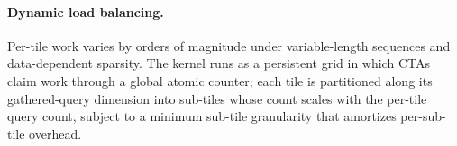 \paragraph{Dynamic load balancing.}
Per-tile work varies by orders of magnitude under variable-length sequences and data-dependent sparsity. The kernel runs as a persistent grid in which CTAs claim work through a global atomic counter; each tile is partitioned along its gathered-query dimension into sub-tiles whose count scales with the per-tile query count, subject to a minimum sub-tile granularity that amortizes per-sub-tile overhead.
